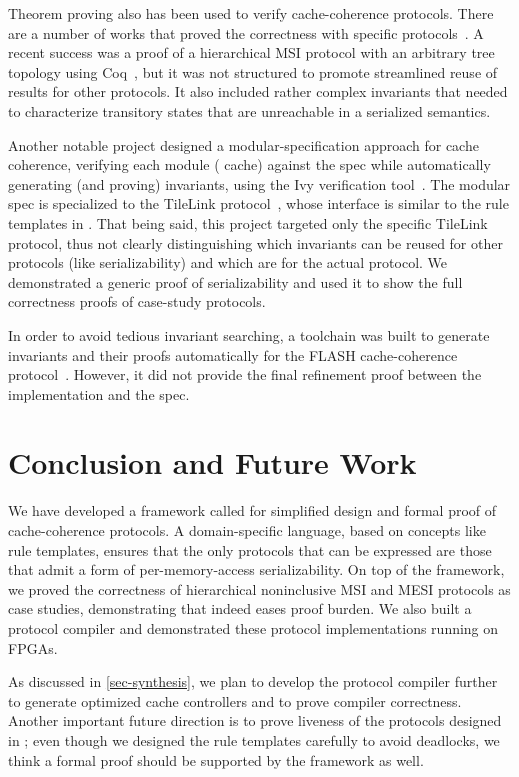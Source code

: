 \documentclass[sigplan,10pt,review,anonymous,screen]{acmart}\settopmatter{printfolios=true,printccs=false,printacmref=false}
\begin{document}
Theorem proving also has been used to verify cache-coherence protocols.
There are a number of works that proved the correctness with specific protocols~\cite{Park:1996,Moore:1998}.
A recent success was a proof of a hierarchical MSI protocol with an arbitrary tree topology using Coq~\cite{Murali:2015}, but it was not structured to promote streamlined reuse of results for other protocols.
It also included rather complex invariants that needed to characterize transitory states that are unreachable in a serialized semantics.

Another notable project designed a modular-specification approach for cache coherence, verifying each module (\ie{} cache) against the spec while automatically generating (and proving) invariants, using the Ivy verification tool~\cite{ivy:Padon:2016, McMillan:2016}.
The modular spec is specialized to the TileLink protocol~\cite{tilelink}, whose interface is similar to the rule templates in \hemiola{}.
That being said, this project targeted only the specific TileLink protocol, thus not clearly distinguishing which invariants can be reused for other protocols (like serializability) and which are for the actual protocol.
We demonstrated a generic proof of serializability and used it to show the full correctness proofs of case-study protocols.

In order to avoid tedious invariant searching, a toolchain was built to generate invariants and their proofs automatically for the FLASH cache-coherence protocol~\cite{Li:2018}.
However, it did not provide the final refinement proof between the implementation and the spec.

\section{Conclusion and Future Work}
\label{sec-conclusion}

We have developed a framework called \hemiola{} for simplified design and formal proof of cache-coherence protocols.
A domain-specific language, based on concepts like rule templates, ensures that the only protocols that can be expressed are those that admit a form of per-memory-access serializability.
On top of the framework, we proved the correctness of hierarchical noninclusive MSI and MESI protocols as case studies, demonstrating that \hemiola{} indeed eases proof burden.
We also built a protocol compiler and demonstrated these protocol implementations running on FPGAs.

As discussed in \autoref{sec-synthesis}, we plan to develop the protocol compiler further to generate optimized cache controllers and to prove compiler correctness.
Another important future direction is to prove liveness of the protocols designed in \hemiola{}; even though we designed the rule templates carefully to avoid deadlocks, we think a formal proof should be supported by the framework as well.
\end{document}
